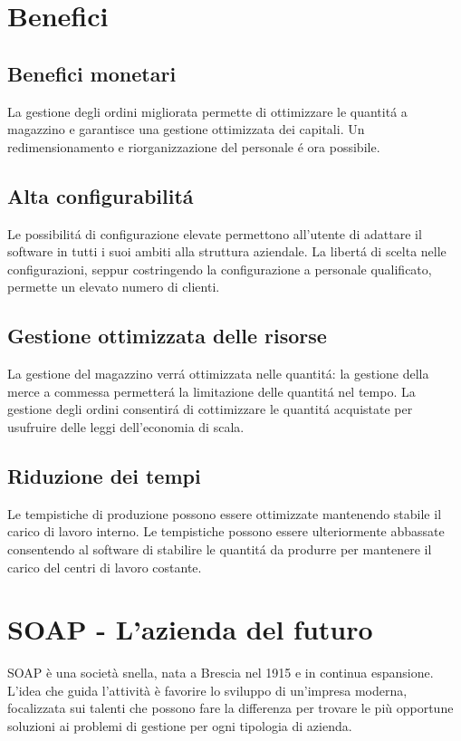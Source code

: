\documentclass[../../documentazione.tex]{subfiles}
\begin{document}
    \section{Benefici}\label{sec:benefici}

    \subsection*{Benefici monetari}\label{subsec:benefici-monetari}
    La gestione degli ordini migliorata permette di ottimizzare le quantitá a magazzino e garantisce una gestione
    ottimizzata dei capitali.
    Un redimensionamento e riorganizzazione del personale é ora possibile.

    \subsection*{Alta configurabilitá}\label{subsec:alta-configurabilitá}
    Le possibilitá di configurazione elevate permettono all'utente di adattare il software in tutti i suoi ambiti
    alla struttura aziendale.
    La libertá di scelta nelle configurazioni, seppur costringendo la configurazione a personale qualificato,
    permette un elevato numero di clienti.

    \subsection*{Gestione ottimizzata delle risorse}\label{subsec:gestione-ottimizzata-delle-risorse}
    La gestione del magazzino verrá ottimizzata nelle quantitá: la gestione della merce a commessa permetterá la limitazione
    delle quantitá nel tempo.
    La gestione degli ordini consentirá di cottimizzare le quantitá acquistate per usufruire delle leggi dell'economia di scala.

    \subsection*{Riduzione dei tempi}\label{subsec:riduzione-dei-tempi}
    Le tempistiche di produzione possono essere ottimizzate mantenendo stabile il carico di lavoro interno.
    Le tempistiche possono essere ulteriormente abbassate consentendo al software di stabilire le quantitá da produrre per
    mantenere il carico del centri di lavoro costante.

    \section{SOAP - L'azienda del futuro}\label{sec:soap---l'azienda-del-futuro}
    SOAP è una società snella, nata a Brescia nel 1915 e in continua espansione.
    L'idea che guida l'attività è favorire lo sviluppo di un'impresa moderna, focalizzata sui talenti che possono fare
    la differenza per trovare le più opportune soluzioni ai problemi di gestione per ogni tipologia di azienda.
\end{document}
